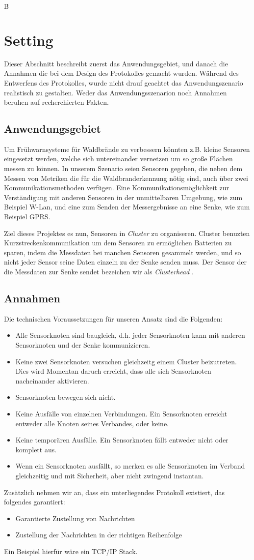 B\section{Setting} \label{sec:setting}
Dieser Abschnitt beschreibt zuerst das Anwendungsgebiet, und danach die Annahmen die bei dem Design des Protokolles gemacht wurden.
W\"ahrend des Entwerfens des Protokolles, wurde nicht drauf geachtet das Anwendungszenario realistisch zu gestalten. Weder das Anwendungsszenarion noch Annahmen beruhen auf recherchierten Fakten.

\subsection{Anwendungsgebiet}
Um Fr\"uhwarnsysteme f\"ur Waldbr\"ande zu verbessern k\"onnten z.B. kleine Sensoren eingesetzt werden, welche sich untereinander vernetzen um so gro\ss e Fl\"achen messen zu k\"onnen.
In unserem Szenario seien Sensoren gegeben, die neben dem Messen von Metriken die f\"ur die Waldbranderkennung n\"otig sind, auch \"uber zwei Kommunikationsmethoden verf\"ugen. Eine Kommunikationsm\"oglichkeit zur Verst\"andigung mit anderen Sensoren in der unmittelbaren Umgebung, wie zum Beispiel W-Lan, und eine zum Senden der Messergebnisse an eine Senke, wie zum Beispiel GPRS.

Ziel dieses Projektes es nun, Sensoren in \emph{Cluster} zu organiseren.
Cluster benuzten Kurzstreckenkommunikation um dem Sensoren zu erm\"oglichen Batterien zu sparen, indem die Messdaten bei manchen Sensoren gesammelt werden, und so nicht jeder Sensor seine Daten einzeln zu der Senke senden muss.
Der Sensor der die Messdaten zur Senke sendet bezeichen wir als \emph{Clusterhead} .

\subsection{Annahmen}
Die technischen Voraussetzungen f\"ur unseren Ansatz sind die Folgenden:
\begin{itemize}
\item Alle Sensorknoten sind baugleich, d.h. jeder Sensorknoten kann mit anderen Sensorknoten und der Senke kommunizieren.
\item Keine zwei Sensorknoten versuchen gleichzeitg einem Cluster beizutreten. Dies wird Momentan daruch erreicht, dass alle sich Sensorknoten nacheinander aktivieren.
\item Sensorknoten bewegen sich nicht.
\item Keine Ausfälle von einzelnen Verbindungen. Ein Sensorknoten erreicht entweder alle Knoten seines Verbandes, oder keine.
\item Keine tempor\"aren Ausf\"alle. Ein Sensorknoten f\"allt entweder nicht oder komplett aus.
\item Wenn ein Sensorknoten ausf\"allt, so merken es alle Sensorknoten im Verband gleichzeitig und mit Sicherheit, aber nicht zwingend instantan.
\end{itemize}

\noindent Zus\"atzlich nehmen wir an, dass ein unterliegendes Protokoll existiert, das folgendes garantiert:
\begin{itemize}
\item Garantierte Zustellung von Nachrichten
\item Zustellung der Nachrichten in der richtigen Reihenfolge
\end{itemize}
Ein Beispiel hierf\"ur w\"are ein TCP/IP Stack.
